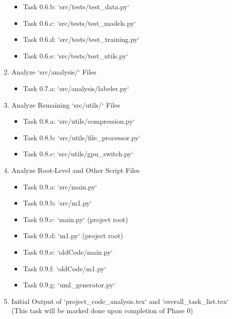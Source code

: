 \documentclass{article}
\begin{document}
\begin{enumerate}[label=\textbf{Phase \arabic*:}, wide, labelwidth=!, labelindent=0pt]
\begin{enumerate}[label=\textbf{Task 0.\arabic*:}, wide, labelwidth=!, labelindent=0pt, leftmargin=*]
\begin{itemize}
            \item[\textbullet] Task 0.6.b: `src/tests/test_data.py`
            \item[\textbullet] Task 0.6.c: `src/tests/test_models.py`
            \item[\textbullet] Task 0.6.d: `src/tests/test_training.py`
            \item[\textbullet] Task 0.6.e: `src/tests/test_utils.py`
        \end{itemize}
        \item Analyze `src/analysis/` Files
        \begin{itemize}
            \item[\textbullet] Task 0.7.a: `src/analysis/labeler.py`
        \end{itemize}
        \item Analyze Remaining `src/utils/` Files
        \begin{itemize}
            \item[\textbullet] Task 0.8.a: `src/utils/compression.py`
            \item[\textbullet] Task 0.8.b: `src/utils/file_processor.py`
            \item[\textbullet] Task 0.8.c: `src/utils/gpu_switch.py`
        \end{itemize}
        \item Analyze Root-Level and Other Script Files
        \begin{itemize}
            \item[\textbullet] Task 0.9.a: `src/main.py`
            \item[\textbullet] Task 0.9.b: `src/m1.py`
            \item[\textbullet] Task 0.9.c: `main.py` (project root)
            \item[\textbullet] Task 0.9.d: `m1.py` (project root)
            \item[\textbullet] Task 0.9.e: `oldCode/main.py`
            \item[\textbullet] Task 0.9.f: `oldCode/m1.py`
            \item[\textbullet] Task 0.9.g: `uml_generator.py`
        \end{itemize}
        \item Initial Output of `project_code_analysis.tex` and `overall_task_list.tex` (This task will be marked done upon completion of Phase 0)
    \end{enumerate}


\end{enumerate}
\end{document}
